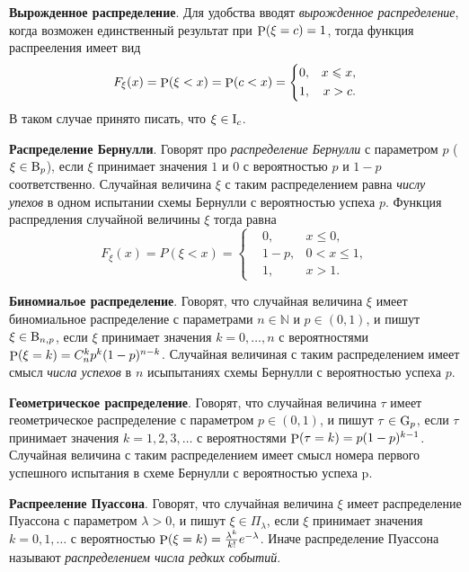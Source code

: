 \textbf{Вырожденное распределение}. 
Для удобства вводят \textit{вырожденное распределение}, когда возможен единственный результат при $\P (\xi = c)=1$, тогда функция распрееления имеет вид
\begin{equation*}
    F_\xi (x) = \P (\xi < x) = \P(c < x) = \left\{\begin{aligned}
        &0, &x \leq x, \\
        &1, &x > c.
    \end{aligned}\right.
\end{equation*}
В таком случае принято писать, что $\xi \in \textnormal{I}_c$.


\textbf{Распределение Бернулли}.
Говорят про \textit{распределение Бернулли} с параметром $p$ ($\xi \in \textnormal{B}_p$), если $\xi$ принимает значения $1$ и $0$ с вероятностью $p$ и $1-p$ соответственно. Случайная величина $\xi$ с таким распределением равна \textit{числу упехов} в одном испытании схемы Бернулли с вероятностью успеха $p$. Функция распредления случайной величины $\xi$ тогда равна
\begin{equation*}
    F_\xi (x) = P(\xi < x) = \left\{\begin{aligned}
        &0, &x \leq 0, \\
        &1-p, &0 < x \leq 1, \\
        &1, &x > 1.
    \end{aligned}\right.
\end{equation*}


\textbf{Биномиальое распределение}. 
Говорят, что случайная величина $\xi$ имеет биномиальное распределение с параметрами $n \in \mathbb{N}$ и $p \in (0, 1)$, и пишут $\xi \in \textnormal{B}_{n,p}$, если $\xi$ принимает значения $k = 0, \ldots, n$ с вероятностями $\P (\xi = k) = C_n^k p^k (1-p)^{n-k}$. Случайная величиная с таким распределением имеет смысл \textit{числа успехов} в $n$ исыпытаниях схемы Бернулли с вероятностью успеха $p$. 

\textbf{Геометрическое распределение}.
Говорят, что случайная величина $\tau$ имеет геометрическое распределение с параметром $p \in (0, 1)$, и пишут $\tau \in \textnormal{G}_p$, если $\tau$ принимает значения $k =1, 2, 3, \ldots$ с вероятностями $\P(\tau = k) = p (1-p)^{k-1}$. 
Случайная величина с таким распределением имеет смысл номера первого успешного испытания в схеме Бернулли с вероятностью успеха p.



\textbf{Распрееление Пуассона}. Говорят, что случайная величина $\xi$ имеет распределение Пуассона с параметром $\lambda > 0$, и пишут $\xi \in \Pi_\lambda$, если $\xi$ принимает значения $k = 0, 1, \ldots$ с вероятностью $\P(\xi = k) = \frac{\lambda^k}{k!} e^{-\lambda}$. Иначе распределение Пуассона называют \textit{распределением числа редких событий}. 


